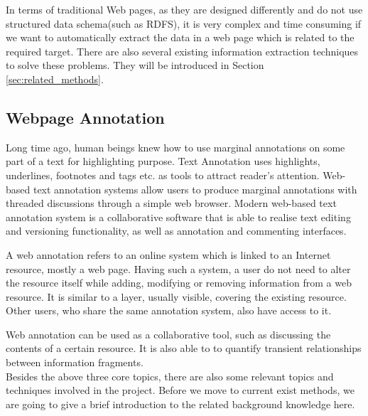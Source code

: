 In terms of traditional Web pages, as they are designed differently and do not use structured data schema(such as RDFS), it is very complex and time consuming if we want to automatically extract the data in a web page which is related to the required target. There are also several existing information extraction techniques to solve these problems. They will be introduced in Section \ref{sec:related_methods}.

\subsection{Webpage Annotation}
Long time ago, human beings knew how to use marginal annotations on some part of a text for highlighting purpose. Text Annotation uses highlights, underlines, footnotes and tags etc. as tools to attract reader's attention\cite{shabajee2003annotation}. Web-based text annotation systems allow users to produce marginal annotations with threaded discussions through a simple web browser. Modern web-based text annotation system is a collaborative software that is able to realise text editing and versioning functionality, as well as annotation and commenting interfaces\cite{lebow2009new}. 

A web annotation refers to an online system which is linked to an Internet resource, mostly a web page. Having such a system, a user do not need to alter the resource itself while adding, modifying or removing information from a web resource. It is similar to a layer, usually visible, covering the existing resource. Other users, who share the same annotation system, also have access to it.

Web annotation can be used as a collaborative tool, such as discussing the contents of a certain resource. It is also able to to quantify transient relationships between information fragments.\\

Besides the above three core topics, there are also some relevant topics and techniques involved in the project. Before we move to current exist methods, we are going to give a brief introduction to the related background knowledge here.

